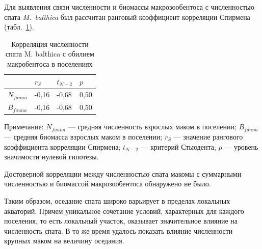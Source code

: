 Для выявления связи численности и биомассы макрозообентоса с численностью спата {\it M.~balthica} был рассчитан ранговый коэффициент корреляции Спирмена (табл.~\ref{spat_fauna_correlation}). 
\begin{table}[p]
\caption{Корреляция численности спата M. balthica с обилием макробентоса в поселениях}
\label{spat_fauna_correlation}
\begin{center}
\begin{tabular}{|l|lll|}
\hline
     & $r_S$    & $t_{N-2}$   & $p$    \\ \hline
$N_{fauna}$  & -0,16 & -0,68 & 0,50 \\
$B_{fauna}$  & -0,16 & -0,68 & 0,50\\
\hline
\end{tabular}
\end{center}

\footnotesize{Примечание: $N_{fauna}$ --- средняя численность взрослых маком в поселении; 
$B_{fauna}$ --- средняя биомасса взрослых маком в поселении; 
$r_S$ --- значение рангового коэффициента корреляции Спирмена; 
$t_{N-2}$ --- критерий Стьюдента;   
$p$ --- уровень значимости нулевой гипотезы.}
\end{table}
Достоверной корреляции между численностью спата макомы с суммарными численностью и биомассой макрозообентоса обнаружено не было.


\bigskip
Таким образом, оседание спата широко варьирует в пределах локальных акваторий.
Причем уникальное сочетание условий, характерных для каждого поселения, то есть локальный участок, оказывает значительное влияние на численность спата.
В то же время удалось показать влияние численности крупных маком на величину оседания.


\afterpage{\clearpage}
